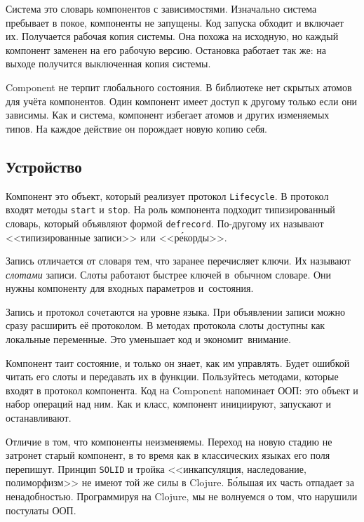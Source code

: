 Система это словарь компонентов с зависимостями. Изначально система пребывает в
покое, компоненты не запущены. Код запуска обходит и включает их. Получается
рабочая копия системы. Она похожа на исходную, но каждый компонент заменен на
его рабочую версию. Остановка работает так же: на выходе получится выключенная
копия системы.

Component не терпит глобального состояния. В библиотеке нет скрытых атомов для
учёта компонентов. Один компонент имеет доступ к другому только если они
зависимы. Как и система, компонент избегает атомов и других изменяемых типов. На
каждое действие он порождает новую копию себя.

\subsection{Устройство}

\label{defrecord}

Компонент это объект, который реализует протокол \verb|Lifecycle|. В протокол
входят методы \verb|start| и \verb|stop|. На роль компонента подходит
типизированный словарь, который объявляют формой \verb|defrecord|. По-другому их
называют <<типизированные записи>> или <<р\'{е}корды>>.


Запись отличается от словаря тем, что заранее перечисляет ключи. Их называют
\emph{слотами} записи. Слоты работают быстрее ключей в~обычном словаре. Они
нужны компоненту для входных параметров и~состояния.

Запись и протокол сочетаются на уровне языка. При объявлении записи можно сразу
расширить её протоколом. В методах протокола слоты доступны как локальные
переменные. Это уменьшает код и экономит~внимание.


Компонент таит состояние, и только он знает, как им управлять. Будет ошибкой
читать его слоты и передавать их в функции. Пользуйтесь методами, которые входят
в протокол компонента. Код на Component напоминает ООП: это объект и набор
операций над ним. Как и класс, компонент инициируют, запускают и останавливают.


Отличие в том, что компоненты неизменяемы. Переход на новую стадию не затронет
старый компонент, в то время как в классических языках его поля
перепишут. Принцип \verb|SOLID| и тройка <<инкапсуляция, наследование,
полиморфизм>> не имеют той же силы в Clojure. Б\'{о}льшая их часть отпадает за
ненадобностью. Программируя на Clojure, мы не волнуемся о том, что нарушили
постулаты ООП.

